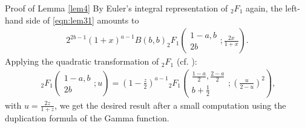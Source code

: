 \documentclass[12pt]{article}
\numberwithin{equation}{section}
\newenvironment{proof*}[1]{\noindent{\textit{#1.\ }}}{\hspace*{\fill}$\Box$\medskip}
\begin{document}
\begin{proof*}{Proof of Lemma \ref{lem4}}
  By Euler's integral representation of $_2 F_1$ again,
  the left-hand side of \eqref{eqn:lem31} amounts to
  \begin{eqnarray}
    & \displaystyle2^{2 b - 1} (1 +
    x)^{a - 1} B (b, b)_2 F_1 \left( \begin{array}{c}
      1 - a, b\\
      2 b
    \end{array} ; \frac{2 x}{1 + x} \right) .  \label{eqn:quad} & 
  \end{eqnarray}
  Applying the quadratic transformation of $_2 F_1$ (cf. {\cite[Thm.
  3.13]{andrews2000special}}):
  \begin{eqnarray}
    & \;_2 F_1 \left( \begin{array}{c}
      \displaystyle1 - a, b\\
      2 b
    \end{array} ; u \right) = \left( 1 - \frac{z}{2} \right)^{a - 1}{}_2 F_1
    \left( \begin{array}{c}
      \displaystyle\frac{1 - a}{2}, \frac{2 - a}{2}\\
      b + \frac{1}{2}
    \end{array} ; \displaystyle\left( \frac{u}{2 - u} \right)^2 \right), &  \nonumber
  \end{eqnarray}
  with $u = \frac{2 z}{1 + z}$, we get the desired result after a small
  computation using the duplication formula of the Gamma function.
\end{proof*}
\end{document}
